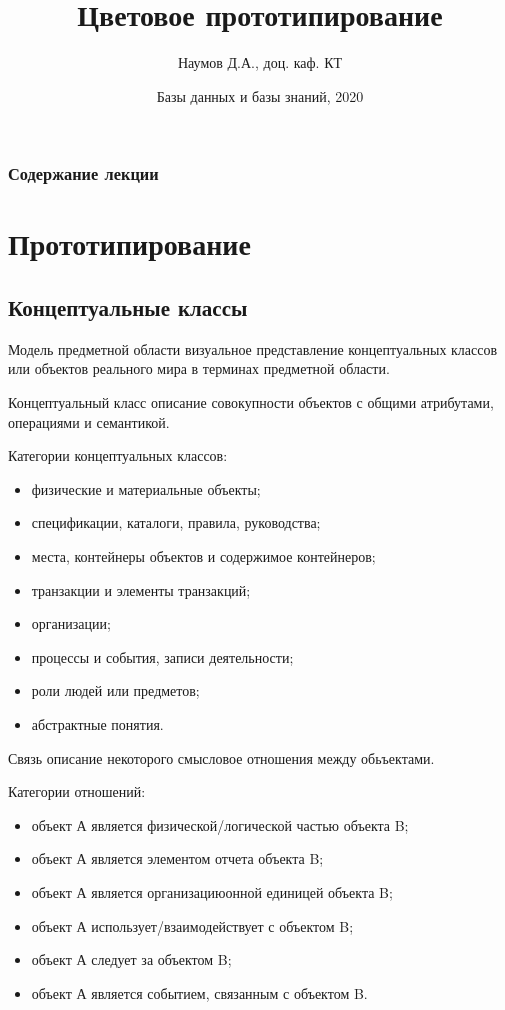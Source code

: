 \documentclass{beamer}
\title[Color patterns]{Цветовое прототипирование}
\author{Наумов Д.А., доц. каф. КТ}
\date[29.02.2020] {Базы данных и базы знаний, 2020}
\begin{document}
\begin{frame}
  \titlepage
\end{frame}
  
\begin{frame}
  \frametitle{Содержание лекции}
  \tableofcontents  
\end{frame}
  
\section{Прототипирование}
\subsection{Концептуальные классы}
\begin{frame}
\begin{block}{Модель предметной области}
визуальное представление концептуальных классов или объектов реального мира в терминах предметной области.
\end{block}
\begin{block}{Концептуальный класс}
описание совокупности объектов с общими атрибутами, операциями и семантикой.
\end{block}
Категории концептуальных классов:
\begin{itemize}
\item физические и материальные объекты;
\item спецификации, каталоги, правила, руководства;
\item места, контейнеры объектов и содержимое контейнеров;
\item транзакции и элементы транзакций;
\item организации; 
\item процессы и события, записи деятельности;
\item роли людей или предметов;
\item абстрактные понятия.
\end{itemize}
\end{frame}

\begin{frame}
\begin{block}{Связь}
описание некоторого смысловое отношения между обьъектами.
\end{block}
Категории отношений:
\begin{itemize}
\item объект А является физической/логической частью объекта B;
\item объект А является элементом отчета объекта B;
\item объект А является организациюонной единицей объекта B;
\item объект А использует/взаимодействует с объектом B;
\item объект А следует за объектом B;
\item объект А является событием, связанным с объектом B.
\end{itemize}
\end{frame}
\end{document}
